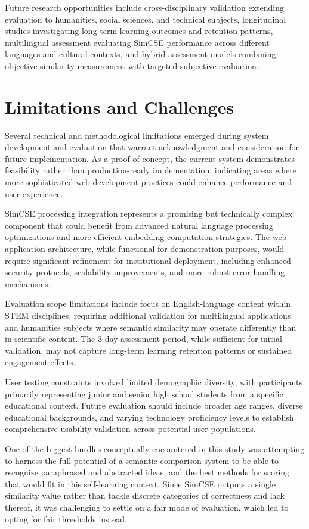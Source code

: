 {{Future research opportunities include cross-disciplinary validation extending evaluation to humanities, social sciences, and technical subjects, longitudinal studies investigating long-term learning outcomes and retention patterns, multilingual assessment evaluating SimCSE performance across different languages and cultural contexts, and hybrid assessment models combining objective similarity measurement with targeted subjective evaluation.
}

\section{Limitations and Challenges}

Several technical and methodological limitations emerged during system development and evaluation that warrant acknowledgment and consideration for future implementation. As a proof of concept, the current system demonstrates feasibility rather than production-ready implementation, indicating areas where more sophisticated web development practices could enhance performance and user experience.

SimCSE processing integration represents a promising but technically complex component that could benefit from advanced natural language processing optimizations and more efficient embedding computation strategies. The web application architecture, while functional for demonstration purposes, would require significant refinement for institutional deployment, including enhanced security protocols, scalability improvements, and more robust error handling mechanisms.

Evaluation scope limitations include focus on English-language content within STEM disciplines, requiring additional validation for multilingual applications and humanities subjects where semantic similarity may operate differently than in scientific content. The 3-day assessment period, while sufficient for initial validation, may not capture long-term learning retention patterns or sustained engagement effects.

User testing constraints involved limited demographic diversity, with participants primarily representing junior and senior high school students from a specific educational context. Future evaluation should include broader age ranges, diverse educational backgrounds, and varying technology proficiency levels to establish comprehensive usability validation across potential user populations.

One of the biggest hurdles conceptually encountered in this study was attempting to harness the full potential of a semantic comparison system to be able to recognize paraphrased and abstracted ideas, and the best methods for scoring that would fit in this self-learning context. Since SimCSE outputs a single similarity value rather than tackle discrete categories of correctness and lack thereof, it was challenging to settle on a fair mode of evaluation, which led to opting for fair thresholds instead. 

}
